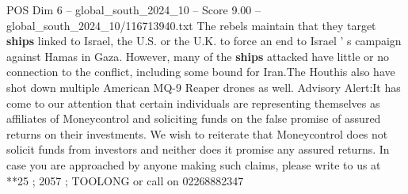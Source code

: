 \begin{textsample}{POS Dim 6 – global\_south\_2024\_10 – Score 9.00 – global\_south\_2024\_10/116713940.txt}
The rebels maintain that they target \textbf{ships} linked to Israel, the U.S. or the U.K. to force an end to Israel ' s campaign against Hamas in Gaza.
However, many of the \textbf{ships} attacked have little or no connection to the conflict, including some bound for Iran.The Houthis also have shot down multiple American MQ-9 Reaper drones as well.
Advisory Alert:It has come to our attention that certain individuals are representing themselves as affiliates of Moneycontrol and soliciting funds on the false promise of assured returns on their investments.
We wish to reiterate that Moneycontrol does not solicit funds from investors and neither does it promise any assured returns.
In case you are approached by anyone making such claims, please write to us at **25 ; 2057 ; TOOLONG or call on 02268882347

\end{textsample}
